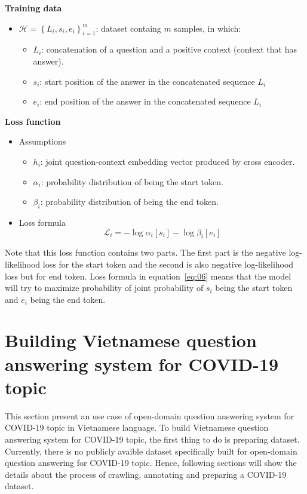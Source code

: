 \documentclass[3p, sort&compress, 12pt]{elsarticle}
\begin{document}
\par \textbf{Training data}
\begin{itemize}
	\item $\mathcal{H} = \left\{ L_i, s_i, e_i\right\}_{i=1}^{m}$: dataset containg $m$ samples, in which:
	\begin{itemize}
		\item $L_i$: concatenation of a question and a positive context (context that has answer).
		\item $s_i$: start position of the answer in the concatenated sequence $L_i$
		\item $e_i$: end position of the answer in the concatenated sequence $L_i$
	\end{itemize}
\end{itemize}
\par \textbf{Loss function}
\begin{itemize}
	\item Assumptions
	\begin{itemize}
		\item $h_i$: joint question-context embedding vector produced by cross encoder.
		\item $\alpha_i$: probability distribution of being the start token.
		\item $\beta_i$: probability distribution of being the end token.
	\end{itemize}
	\item Loss formula 
		\begin{equation}\label{eq:06}\mathcal{L}_i = -\log\alpha_i[s_i] - \log\beta_i[e_i]\end{equation}
\end{itemize}
Note that this loss function contains two parts. The first part is the negative log-likelihood loss for the start token and the second is also negative log-likelihood loss but for end token. Loss formula in equation~\eqref{eq:06} means that the model will try to maximize probability of joint probability of $s_i$ being the start token and $e_i$ being the end token.

\section{Building Vietnamese question answering system for COVID-19 topic}
This section present an use case of open-domain question answering system for COVID-19 topic in Vietnamese language. To build Vietnamese question answering system for COVID-19 topic, the first thing to do is preparing dataset. Currently, there is no publicly avaible dataset specifically built for open-domain question answering for COVID-19 topic. Hence, following sections will show the details about the process of crawling, annotating and preparing a COVID-19 dataset.
\end{document}
